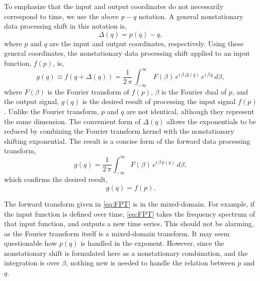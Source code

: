 To emphasize that the input and output coordinates do not necessarily correspond to time, we use the above $p-q$ notation. A general nonstationary data processing shift in this notation is,
\begin{equation}
	\label{eq:Delta}
	\Delta \left( q \right)=p\left( q \right)-q,
\end{equation}
where $p$ and $q$ are the input and output coordinates, respectively.
Using these general coordinates, the nonstationary data processing shift applied to an input function, $f(p)$, is,
\begin{equation}
	\label{eq:FPT_full}
	g \left( q \right) \equiv f \left( q + \Delta \left( q \right) \right) = \frac{1}{2 \, \pi} \, \int_{-\infty}^{\infty} \, F \left( \beta \right) \, e^{i \, \beta \, \Delta \left( q \right)} \, e^{i \, \beta \, q} \, d \beta,
\end{equation}
where $F(\beta )$ is the Fourier transform of $f(p)$, $\beta$ is the Fourier dual of $p$, and the output signal, $g(q)$ is the desired result of processing the input signal $f(p)$.  
Unlike the Fourier transform, $p$ and $q$ are not identical, although they represent the same dimension. 
The convenient form of $\Delta (q)$ allows the exponentials to be reduced by combining the Fourier transform kernel with the nonstationary shifting exponential. The result is a concise form of the forward data processing transform,
\begin{equation}
	\label{eq:FPT}
	g \left( q \right) = \frac{1}{2 \, \pi} \int_{-\infty}^{\infty} F \left( \beta \right) \, e^{i \, \beta \, p \left( q \right)} \, d \beta,
\end{equation}
which confirms the desired result,
\begin{equation}
	\label{eq:FPT_result}
	g \left( q \right) = f \left( p \right).
\end{equation}

The forward transform given in \ref{eq:FPT} is in the mixed-domain.
For example, if the input function is defined over time, \ref{eq:FPT} takes the frequency spectrum of that input function, and outputs a new time series.
This should not be alarming, as the Fourier transform itself is a mixed-domain transform.
It may seem questionable how $p \left( q \right)$ is handled in the exponent.
However, since the nonstationary shift is formulated here as a nonstationary combination, and the integration is over $\beta$, nothing new is needed to handle the relation between $p$ and $q$.

